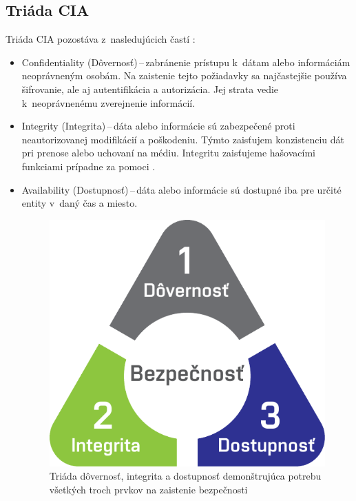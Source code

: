 \subsection{Triáda CIA}
Triáda CIA pozostáva z~nasledujúcich častí \cite{McMillan2018}: 
\begin{itemize}
	\item Confidentiality (Dôvernosť)\,--\,zabránenie prístupu k~dátam alebo informáciám neoprávneným osobám. Na zaistenie tejto požiadavky sa najčastejšie používa šifrovanie, ale aj autentifikácia a autorizácia. Jej strata vedie k~neoprávnenému zverejnenie informácií. 
	
	\item Integrity (Integrita)\,--\,dáta alebo informácie sú zabezpečené proti neautorizovanej modifikácií a poškodeniu. Týmto zaisťujem konzistenciu dát pri prenose alebo uchovaní na médiu. Integritu zaisťujeme hašovacími funkciami prípadne za pomoci . 
	
	\item Availability (Dostupnosť)\,--\,dáta alebo informácie sú dostupné iba pre určité entity v~daný čas a miesto. 

	\begin{figure}[!h]
		\begin{center}
			\includegraphics[scale=0.6]{obrazky/cia.pdf}
		\end{center}
		\caption[Triáda dôvernosť, integrita a dostupnosť]{Triáda dôvernosť, integrita a dostupnosť demonštrujúca potrebu všetkých troch prvkov na zaistenie bezpečnosti \cite{Vyncke2008}}%
\label{cia}
\end{figure}
\end{itemize}

